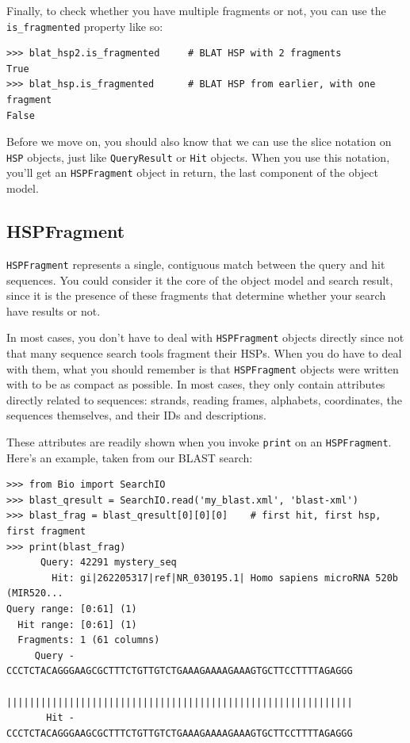 \documentclass{report}
\begin{document}
Finally, to check whether you have multiple fragments or not, you can use the
\verb|is_fragmented| property like so:

\begin{verbatim}
>>> blat_hsp2.is_fragmented     # BLAT HSP with 2 fragments
True
>>> blat_hsp.is_fragmented      # BLAT HSP from earlier, with one fragment
False
\end{verbatim}

Before we move on, you should also know that we can use the slice notation on
\verb|HSP| objects, just like \verb|QueryResult| or \verb|Hit| objects. When
you use this notation, you'll get an \verb|HSPFragment| object in return, the
last component of the object model.

\subsection{HSPFragment}
\label{sec:searchio-hspfragment}

\verb|HSPFragment| represents a single, contiguous match between the query and
hit sequences. You could consider it the core of the object model and search
result, since it is the presence of these fragments that determine whether your
search have results or not.

In most cases, you don't have to deal with \verb|HSPFragment| objects directly
since not that many sequence search tools fragment their HSPs. When you do have
to deal with them, what you should remember is that \verb|HSPFragment| objects
were written with to be as compact as possible. In most cases, they only contain
attributes directly related to sequences: strands, reading frames, alphabets,
coordinates, the sequences themselves, and their IDs and descriptions.

These attributes are readily shown when you invoke \verb|print| on an
\verb|HSPFragment|. Here's an example, taken from our BLAST search:

\begin{verbatim}
>>> from Bio import SearchIO
>>> blast_qresult = SearchIO.read('my_blast.xml', 'blast-xml')
>>> blast_frag = blast_qresult[0][0][0]    # first hit, first hsp, first fragment
>>> print(blast_frag)
      Query: 42291 mystery_seq
        Hit: gi|262205317|ref|NR_030195.1| Homo sapiens microRNA 520b (MIR520...
Query range: [0:61] (1)
  Hit range: [0:61] (1)
  Fragments: 1 (61 columns)
     Query - CCCTCTACAGGGAAGCGCTTTCTGTTGTCTGAAAGAAAAGAAAGTGCTTCCTTTTAGAGGG
             |||||||||||||||||||||||||||||||||||||||||||||||||||||||||||||
       Hit - CCCTCTACAGGGAAGCGCTTTCTGTTGTCTGAAAGAAAAGAAAGTGCTTCCTTTTAGAGGG
\end{verbatim}
\end{document}
